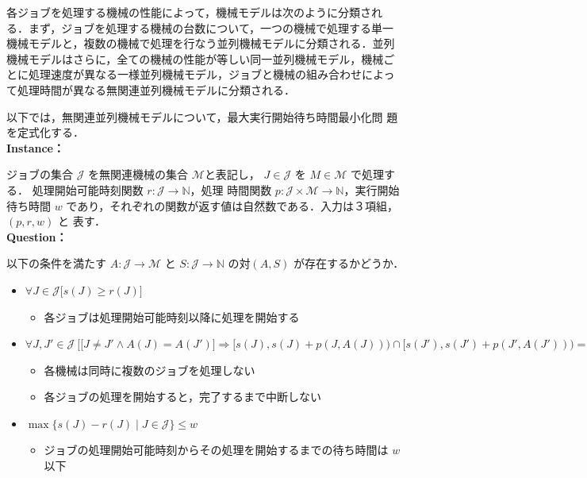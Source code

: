 \documentclass[12pt]{optlab-bachelor}
\begin{document}
各ジョブを処理する機械の性能によって，機械モデルは次のように分類され
る．まず，ジョブを処理する機械の台数について，一つの機械で処理する単一
機械モデルと，複数の機械で処理を行なう並列機械モデルに分類される．並列
機械モデルはさらに，全ての機械の性能が等しい同一並列機械モデル，機械ご
とに処理速度が異なる一様並列機械モデル，ジョブと機械の組み合わせによっ
て処理時間が異なる無関連並列機械モデルに分類される．

以下では，無関連並列機械モデルについて，最大実行開始待ち時間最小化問
題を定式化する．\\

\noindent \textbf{Instance：}

ジョブの集合 $\mathcal{J}$ を無関連機械の集合 $\mathcal{M}$と表記し，
$J \in \mathcal{J}$ を $M \in \mathcal{M}$ で処理する．
処理開始可能時刻関数 $r : \mathcal{J} \to \mathbb{N}$，処理
時間関数 $p : \mathcal{J} \times \mathcal{M} \to \mathbb{N}$，実行開始
待ち時間 $w$ であり，それぞれの関数が返す値は自然数である．入力は３項組，$(p,r,w)$ と
表す．\\

\noindent \textbf{Question：}

以下の条件を満たす $A : \mathcal{J} \to \mathcal{M}$ と $S : \mathcal{J} \to
\mathbb{N}$ の対$(A,S)$ が存在するかどうか．
\begin{itemize}
  \item $\forall J \in \mathcal{J}\big[s(J) \ge r(J) \big]$
  \begin{itemize}
    \item 各ジョブは処理開始可能時刻以降に処理を開始する
  \end{itemize}
  \item $\forall J, J' \in \mathcal{J}\ \Big[ \big[J\ne J' \land A(J) = A(J')\big] \Rightarrow [s(J), s(J)+p(J,A(J))) \cap[s(J'), s(J')+p(J', A(J'))) = \emptyset \Big]$
  \begin{itemize}
    \item 各機械は同時に複数のジョブを処理しない
    \item 各ジョブの処理を開始すると，完了するまで中断しない
  \end{itemize}
  \item $\max\big\{s(J) - r(J) \mid J \in \mathcal{J}\big\} \le w$
  \begin{itemize}
    \item ジョブの処理開始可能時刻からその処理を開始するまでの待ち時間は $w$ 以下
  \end{itemize}
\end{itemize}
\end{document}

